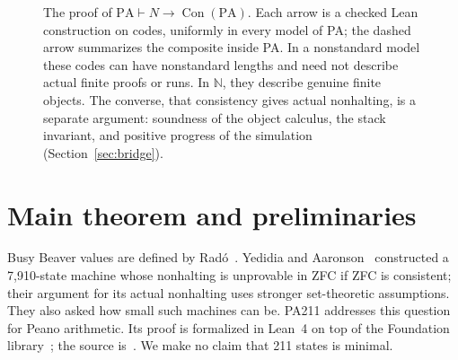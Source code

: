 \documentclass[11pt,letterpaper]{article}
\newcommand{\PA}{\mathrm{PA}}
\newcommand{\NN}{\mathbb{N}}
\newcommand{\Con}{\operatorname{Con}}
\begin{document}
\begin{figure}[ht]
\centering
{}
\caption{The proof of $\PA\vdash N\to\Con(\PA)$. Each arrow is a checked
Lean construction on codes, uniformly in every model of PA; the dashed
arrow summarizes the composite inside PA. In a nonstandard model these
codes can have nonstandard lengths and need not describe actual finite
proofs or runs. In $\NN$, they describe genuine finite objects. The
converse, that consistency gives actual nonhalting, is a separate argument:
soundness of the object calculus, the stack invariant, and positive
progress of the simulation (Section~\ref{sec:bridge}).}
\label{fig:pipeline}
\end{figure}

\section{Main theorem and preliminaries}

Busy Beaver values are defined by Rad\'o~\cite{rado}. Yedidia and
Aaronson~\cite{yedidia} constructed a 7,910-state machine whose
nonhalting is unprovable in ZFC if ZFC is consistent; their argument for
its actual nonhalting uses stronger set-theoretic assumptions. They also
asked how small such machines can be. PA211 addresses this question for
Peano arithmetic. Its proof is
formalized in Lean~4 on top of the Foundation library~\cite{foundation};
the source is~\cite{project}. We make no claim that 211 states is minimal.
\end{document}
